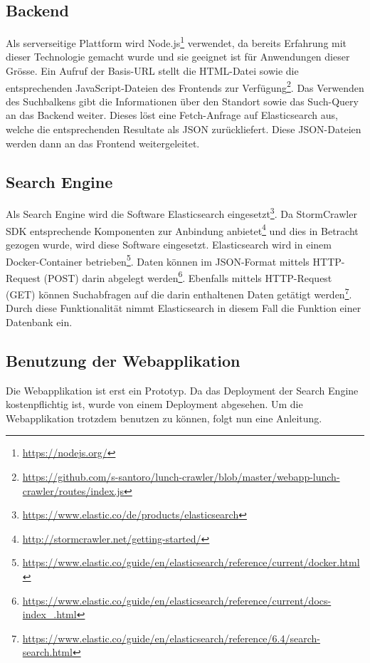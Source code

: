 \subsection{Backend}
Als serverseitige Plattform wird \glqq Node.js\footnote{\url{https://nodejs.org/}}\grqq{} verwendet, da bereits Erfahrung mit dieser Technologie gemacht wurde und sie geeignet ist für Anwendungen dieser Grösse.
Ein Aufruf der Basis-URL stellt die HTML-Datei sowie die entsprechenden JavaScript-Dateien des Frontends zur Verfügung\footnote{\url{https://github.com/s-santoro/lunch-crawler/blob/master/webapp-lunch-crawler/routes/index.js}}.
Das Verwenden des Suchbalkens gibt die Informationen über den Standort sowie das Such-Query an das Backend weiter.
Dieses löst eine Fetch-Anfrage auf Elasticsearch aus, welche die entsprechenden Resultate als JSON zurückliefert.
Diese JSON-Dateien werden dann an das Frontend weitergeleitet.
\subsection{Search Engine}
Als Search Engine wird die Software \glqq Elasticsearch\grqq{} eingesetzt\footnote{\url{https://www.elastic.co/de/products/elasticsearch}}.
Da StormCrawler SDK entsprechende Komponenten zur Anbindung anbietet\footnote{\url{http://stormcrawler.net/getting-started/}} und dies in Betracht gezogen wurde, wird diese Software eingesetzt.
Elasticsearch wird in einem Docker-Container betrieben\footnote{\url{https://www.elastic.co/guide/en/elasticsearch/reference/current/docker.html}}.
Daten können im JSON-Format mittels HTTP-Request (POST) darin abgelegt werden\footnote{\url{https://www.elastic.co/guide/en/elasticsearch/reference/current/docs-index_.html}}.
Ebenfalls mittels HTTP-Request (GET) können Suchabfragen auf die darin enthaltenen Daten getätigt werden\footnote{\url{https://www.elastic.co/guide/en/elasticsearch/reference/6.4/search-search.html}}.
Durch diese Funktionalität nimmt Elasticsearch in diesem Fall die Funktion einer Datenbank ein.
\subsection{Benutzung der Webapplikation}
Die Webapplikation ist erst ein Prototyp.
Da das Deployment der Search Engine kostenpflichtig ist, wurde von einem Deployment abgesehen.
Um die Webapplikation trotzdem benutzen zu können, folgt nun eine Anleitung.\\

